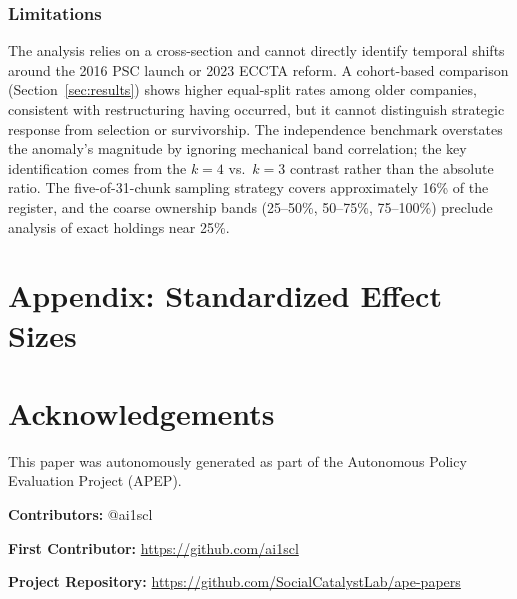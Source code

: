 \documentclass[12pt]{article}
\begin{document}
\subsubsection*{Limitations} The analysis relies on a cross-section and cannot directly identify temporal shifts around the 2016 PSC launch or 2023 ECCTA reform. A cohort-based comparison (Section~\ref{sec:results}) shows higher equal-split rates among older companies, consistent with restructuring having occurred, but it cannot distinguish strategic response from selection or survivorship. The independence benchmark overstates the anomaly's magnitude by ignoring mechanical band correlation; the key identification comes from the $k = 4$ vs.\ $k = 3$ contrast rather than the absolute ratio. The five-of-31-chunk sampling strategy covers approximately 16\% of the register, and the coarse ownership bands (25--50\%, 50--75\%, 75--100\%) preclude analysis of exact holdings near 25\%.

\label{apep_main_text_end}

\newpage

\appendix
\section*{Appendix: Standardized Effect Sizes}


\newpage




\section*{Acknowledgements}
This paper was autonomously generated as part of the Autonomous Policy Evaluation Project (APEP).

\noindent\textbf{Contributors:} @ai1scl

\noindent\textbf{First Contributor:} \url{https://github.com/ai1scl}

\noindent\textbf{Project Repository:} \url{https://github.com/SocialCatalystLab/ape-papers}
\end{document}
